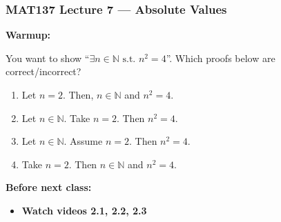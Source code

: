 \documentclass[14pt]{beamer}
\date{}
\title{}
\author{}
\begin{document}

\begin{frame}
\frametitle{MAT137 Lecture 7 --- Absolute Values}
	{\bf Warmup:}
\vfill

	You want to show ``$\exists n\in \mathbb N\text{ s.t. }n^2=4$''. Which proofs below
	are correct/incorrect?
	\begin{multicols}{2}

		\begin{enumerate}
		

			\item Let $n=2$. Then, $n\in \mathbb N$ and $n^2=4$.


			\item 		Let $n\in \mathbb N$. Take $n=2$. Then $n^2=4$.

		\columnbreak

	\item 		Let $n\in\mathbb N$. Assume $n=2$. Then $n^2=4$.


		
	\item	Take $n=2$. Then $n\in \mathbb N$ and $n^2=4$.

		\end{enumerate}

	\end{multicols}

	\vfill
	{\bf Before next class:}
		\begin{itemize} \normalsize
			\item {\bf Watch videos 2.1, 2.2, 2.3 }
		\end{itemize}
	\vfill

\end{frame}
\end{document}
